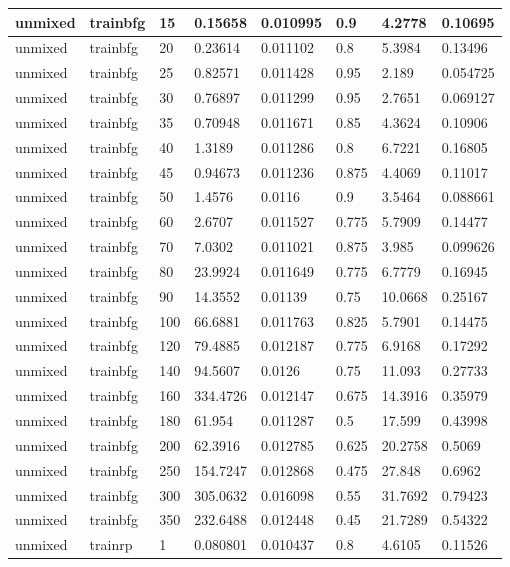 \begin{longtable}{llllllll}
unmixed & trainbfg & 15 & 0.15658 & 0.010995 & 0.9 & 4.2778 & 0.10695 \\ \hline 
unmixed & trainbfg & 20 & 0.23614 & 0.011102 & 0.8 & 5.3984 & 0.13496 \\ \hline 
unmixed & trainbfg & 25 & 0.82571 & 0.011428 & 0.95 & 2.189 & 0.054725 \\ \hline 
unmixed & trainbfg & 30 & 0.76897 & 0.011299 & 0.95 & 2.7651 & 0.069127 \\ \hline 
unmixed & trainbfg & 35 & 0.70948 & 0.011671 & 0.85 & 4.3624 & 0.10906 \\ \hline 
unmixed & trainbfg & 40 & 1.3189 & 0.011286 & 0.8 & 6.7221 & 0.16805 \\ \hline 
unmixed & trainbfg & 45 & 0.94673 & 0.011236 & 0.875 & 4.4069 & 0.11017 \\ \hline 
unmixed & trainbfg & 50 & 1.4576 & 0.0116 & 0.9 & 3.5464 & 0.088661 \\ \hline 
unmixed & trainbfg & 60 & 2.6707 & 0.011527 & 0.775 & 5.7909 & 0.14477 \\ \hline 
unmixed & trainbfg & 70 & 7.0302 & 0.011021 & 0.875 & 3.985 & 0.099626 \\ \hline 
unmixed & trainbfg & 80 & 23.9924 & 0.011649 & 0.775 & 6.7779 & 0.16945 \\ \hline 
unmixed & trainbfg & 90 & 14.3552 & 0.01139 & 0.75 & 10.0668 & 0.25167 \\ \hline 
unmixed & trainbfg & 100 & 66.6881 & 0.011763 & 0.825 & 5.7901 & 0.14475 \\ \hline 
unmixed & trainbfg & 120 & 79.4885 & 0.012187 & 0.775 & 6.9168 & 0.17292 \\ \hline 
unmixed & trainbfg & 140 & 94.5607 & 0.0126 & 0.75 & 11.093 & 0.27733 \\ \hline 
unmixed & trainbfg & 160 & 334.4726 & 0.012147 & 0.675 & 14.3916 & 0.35979 \\ \hline 
unmixed & trainbfg & 180 & 61.954 & 0.011287 & 0.5 & 17.599 & 0.43998 \\ \hline 
unmixed & trainbfg & 200 & 62.3916 & 0.012785 & 0.625 & 20.2758 & 0.5069 \\ \hline 
unmixed & trainbfg & 250 & 154.7247 & 0.012868 & 0.475 & 27.848 & 0.6962 \\ \hline 
unmixed & trainbfg & 300 & 305.0632 & 0.016098 & 0.55 & 31.7692 & 0.79423 \\ \hline 
unmixed & trainbfg & 350 & 232.6488 & 0.012448 & 0.45 & 21.7289 & 0.54322 \\ \hline 
unmixed & trainrp & 1 & 0.080801 & 0.010437 & 0.8 & 4.6105 & 0.11526 \\ \hline 

\end{longtable}
